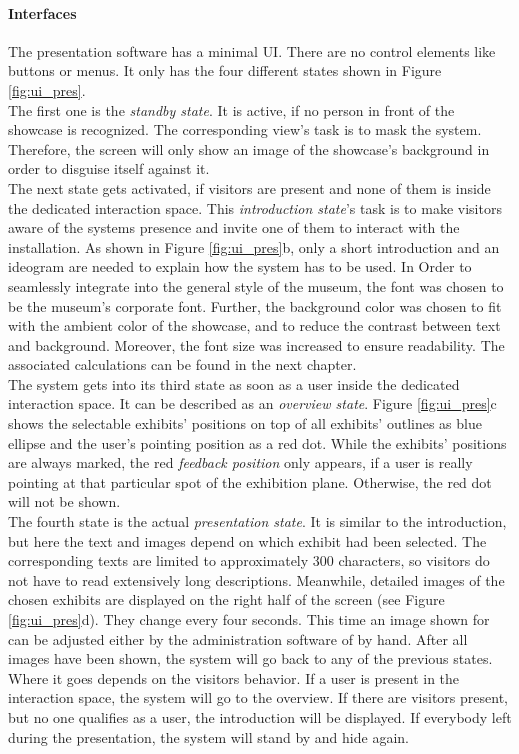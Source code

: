 
\paragraph{Interfaces} The presentation software has a minimal \ac{UI}. There are no control elements like buttons or menus. It only has the four different states shown in Figure \ref{fig:ui_pres}.
\\
The first one is the \textit{standby state}. It is active, if no person in front of the showcase is recognized. The corresponding view's task is to mask the system. Therefore, the screen will only show an image of the showcase's background in order to disguise itself against it. 
\\
The next state gets activated, if visitors are present and none of them is inside the dedicated interaction space. This \textit{introduction state}'s task is to make visitors aware of the systems presence and invite one of them to interact with the installation. As shown in Figure \ref{fig:ui_pres}b, only a short introduction and an ideogram are needed to explain how the system has to be used. In Order to seamlessly integrate into the general style of the museum, the font was chosen to be the museum's corporate font. Further, the background color was chosen to fit with the ambient color of the showcase, and to reduce the contrast between text and background. Moreover, the font size was increased to ensure readability. The associated calculations can be found in the next chapter. 
\\
The system gets into its third state as soon as a user inside the dedicated interaction space. It can be described as an \textit{overview state}. Figure \ref{fig:ui_pres}c shows the selectable exhibits' positions on top of all exhibits' outlines as blue ellipse and the user's pointing position as a red dot. While the exhibits' positions are always marked, the red \textit{feedback position} only appears, if a user is really pointing at that particular spot of the exhibition plane. Otherwise, the red dot will not be shown.
\\
The fourth state is the actual \textit{presentation state}. It is similar to the introduction, but here the text and images depend on which exhibit had been selected. The corresponding texts are limited to approximately 300 characters, so visitors do not have to read extensively long descriptions. Meanwhile, detailed images of the chosen exhibits are displayed on the right half of the screen (see Figure \ref{fig:ui_pres}d). They change every four seconds. This time an image shown for can be adjusted either by the administration software of by hand. After all images have been shown, the system will go back to any of the previous states. Where it goes depends on the visitors behavior. If a user is present in the interaction space, the system will go to the overview. If there are visitors present, but no one qualifies as a user, the introduction will be displayed. If everybody left during the presentation, the system will stand by and hide again.
